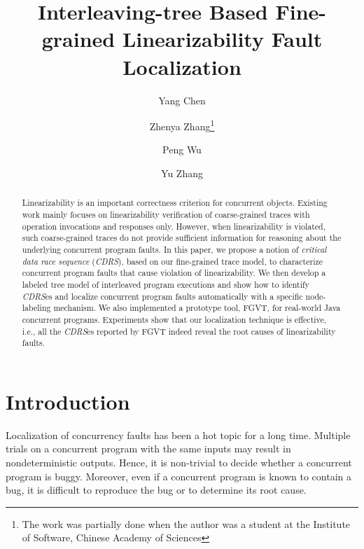 \documentclass[runningheads]{llncs}
\begin{document}
%
\title{Interleaving-tree Based Fine-grained Linearizability Fault Localization}
%
%
\author{Yang Chen \and
Zhenya Zhang\thanks{The work was partially done when the author was a student at the Institute of Software, Chinese Academy of Sciences} \and
Peng Wu\and
Yu Zhang}
%
%
%
\maketitle              %
%
\begin{abstract}
Linearizability is an important correctness criterion for concurrent objects. Existing work mainly focuses on linearizability verification of coarse-grained traces with operation invocations and responses only. However, when linearizability is violated, such coarse-grained traces do not provide sufficient information for reasoning about the underlying concurrent program faults. In this paper, we propose a notion of \textit{critical data race sequence} (\textit{CDRS}), based on our fine-grained trace model, to characterize concurrent program faults that cause violation of linearizability. We then develop a labeled tree model of interleaved program executions and show how to identify \textit{CDRS}es and localize concurrent program faults automatically with a specific node-labeling mechanism. We also implemented a prototype tool, FGVT, for real-world Java concurrent programs. Experiments show that our localization technique is effective, i.e., all the \textit{CDRS}es reported by FGVT indeed reveal the root causes of linearizability faults.

\end{abstract}
%
%
%
%
%
\section{Introduction}\label{sec:introduction}
Localization of concurrency faults has been a hot topic for a long time. 
Multiple trials on a concurrent program with the same inputs may result in nondeterministic outputs. Hence, it is non-trivial to decide whether a concurrent program is buggy. Moreover, even if a concurrent program is known to contain a bug, it is difficult to reproduce the bug or to determine its root cause.
\end{document}
